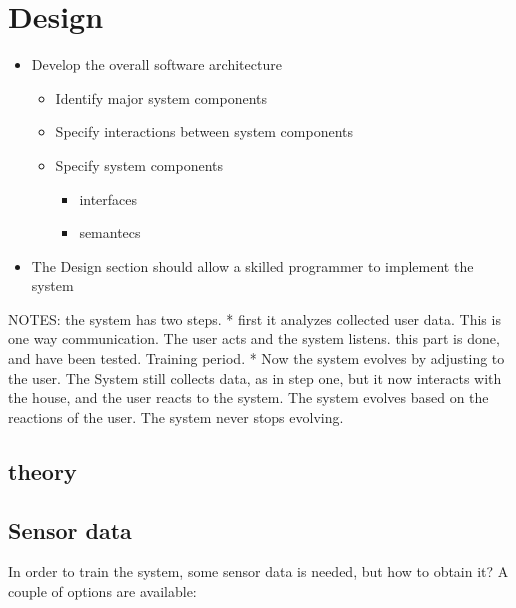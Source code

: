 \chapter{Design}
\label{design}

\begin{itemize}
\item Develop the overall software architecture

\begin{itemize}
\item Identify major system components

\item Specify interactions between system components

\item Specify system components

\begin{itemize}
\item interfaces

\item semantecs

\end{itemize}

\end{itemize}

\item The Design section should allow a skilled programmer to implement the system

\end{itemize}

NOTES:
the system has two steps.
* first it analyzes collected user data. This is one way communication. The user acts and the system listens. this part is done, and have been tested. Training period.
* Now the system evolves by adjusting to the user. The System still collects data, as in step one, but it now interacts with the house, and the user reacts to the system. The system evolves based on the reactions of the user. The system never stops evolving. 

\section{theory}
\label{theory}

\section{Sensor data}
\label{sensordata}

In order to train the system, some sensor data is needed, but how to obtain it? A couple of options are available:

